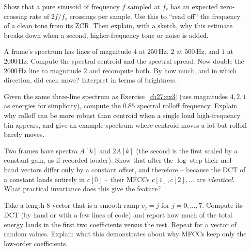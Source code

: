 \begin{exercise}
\label{ch27:ex2}
Show that a pure sinusoid of frequency $f$ sampled at $f_s$ has an expected
zero-crossing rate of $2f/f_s$ crossings per sample. Use this to ``read off'' the
frequency of a clean tone from its ZCR. Then explain, with a sketch, why this
estimate breaks down when a second, higher-frequency tone or noise is added.
\end{exercise}

\begin{exercise}
\label{ch27:ex3}
A frame's spectrum has lines of magnitude $4$ at $250$\,Hz, $2$ at $500$\,Hz, and
$1$ at $2000$\,Hz. Compute the spectral centroid and the spectral spread. Now
double the $2000$\,Hz line to magnitude $2$ and recompute both. By how much, and in
which direction, did each move? Interpret in terms of brightness.
\end{exercise}

\begin{exercise}
\label{ch27:ex4}
Given the same three-line spectrum as Exercise~\ref{ch27:ex3} (use magnitudes
$4, 2, 1$ as energies for simplicity), compute the $0.85$ spectral rolloff
frequency. Explain why rolloff can be more robust than centroid when a single
loud high-frequency bin appears, and give an example spectrum where centroid moves
a lot but rolloff barely moves.
\end{exercise}

\begin{exercise}
\label{ch27:ex5}
Two frames have spectra $A[k]$ and $2A[k]$ (the second is the first scaled by a
constant gain, as if recorded louder). Show that after the $\log$ step their
mel-band vectors differ only by a constant offset, and therefore -- because the
DCT of a constant lands entirely in $c[0]$ -- their MFCCs $c[1], c[2], \dots$ are
\emph{identical}. What practical invariance does this give the feature?
\end{exercise}

\begin{exercise}
\label{ch27:ex6}
Take a length-8 vector that is a smooth ramp $v_j = j$ for $j=0,\dots,7$. Compute
its DCT (by hand or with a few lines of code) and report how much of the total
energy lands in the first two coefficients versus the rest. Repeat for a vector of
random values. Explain what this demonstrates about why MFCCs keep only the
low-order coefficients.
\end{exercise}

